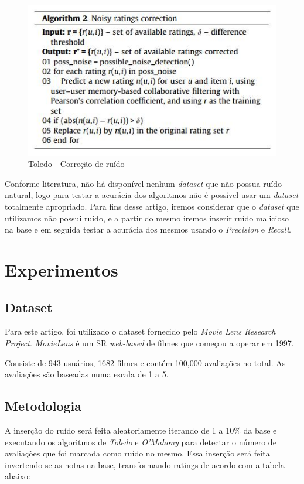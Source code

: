 \documentclass{sig-alternate}
\begin{document}
\begin{figure}[h!]
	\centering
	\includegraphics[width=1.0\linewidth]{correcao_toledo}
	\caption{Toledo - Correção de ruído}
	\label{fig:correcao_toledo}
\end{figure}

Conforme literatura, não há disponível nenhum \emph{dataset} que não possua ruído natural, logo para testar a acurácia dos algoritmos não é possível usar um \emph{dataset} totalmente apropriado. Para fins desse artigo, iremos considerar que o \emph{dataset} que utilizamos não possui ruído, e a partir do mesmo iremos inserir ruído malicioso na base e em seguida testar a acurácia dos mesmos usando o \emph{Precision} e \emph{Recall}.


\section{Experimentos}


\subsection{Dataset}
Para este artigo, foi utilizado o dataset fornecido pelo \emph{Movie Lens Research Project}. \emph{MovieLens} é um SR \emph{web-based} de filmes que começou a operar em 1997.

Consiste de 943 usuários, 1682 filmes e contém 100,000 avaliações no total. As avaliações são baseadas numa escala de 1 a 5.

\subsection{Metodologia}

A inserção do ruído será feita aleatoriamente iterando de 1 a 10\% da base e executando os algoritmos de \emph{Toledo} e \emph{O'Mahony} para detectar o número de avaliações que foi marcada como ruído no mesmo. Essa inserção será feita invertendo-se as notas na base, transformando ratings de acordo com a tabela abaixo:
\end{document}
